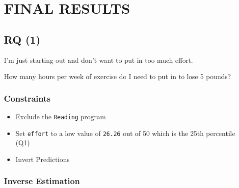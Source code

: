 \documentclass[
]{article}
\providecommand{\tightlist}{%
  \setlength{\itemsep}{0pt}\setlength{\parskip}{0pt}}
\begin{document}
\clearpage

\hypertarget{final-results}{%
\section{FINAL RESULTS}\label{final-results}}

\hypertarget{rq-1-1}{%
\subsection{RQ (1)}\label{rq-1-1}}

I'm just starting out and don't want to put in too much effort.

How many hours per week of exercise do I need to put in to lose 5
pounds?

\hypertarget{constraints}{%
\subsubsection{Constraints}\label{constraints}}

\begin{itemize}
\tightlist
\item
  Exclude the \texttt{Reading} program
\item
  Set \texttt{effort} to a low value of \texttt{26.26} out of 50 which
  is the 25th percentile (Q1)
\item
  Invert Predictions
\end{itemize}

\clearpage

\hypertarget{inverse-estimation}{%
\subsubsection{Inverse Estimation}\label{inverse-estimation}}
\end{document}
